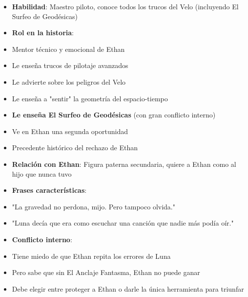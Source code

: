 \documentclass[11pt,a4paper]{report}
\begin{document}
\begin{itemize}
  \item \textbf{Habilidad}: Maestro piloto, conoce todos los trucos del Velo (incluyendo El Surfeo de Geodésicas)
  \item \textbf{Rol en la historia}: 
  \item Mentor técnico y emocional de Ethan
  \item Le enseña trucos de pilotaje avanzados
  \item Le advierte sobre los peligros del Velo
  \item Le enseña a "sentir" la geometría del espacio-tiempo
  \item \textbf{Le enseña El Surfeo de Geodésicas} (con gran conflicto interno)
  \item Ve en Ethan una segunda oportunidad
  \item Precedente histórico del rechazo de Ethan
  \item \textbf{Relación con Ethan}: Figura paterna secundaria, quiere a Ethan como al hijo que nunca tuvo
  \item \textbf{Frases características}: 
  \item "La gravedad no perdona, mijo. Pero tampoco olvida."
  \item "Luna decía que era como escuchar una canción que nadie más podía oír."
  \item \textbf{Conflicto interno}: 
  \item Tiene miedo de que Ethan repita los errores de Luna
  \item Pero sabe que sin El Anclaje Fantasma, Ethan no puede ganar
  \item Debe elegir entre proteger a Ethan o darle la única herramienta para triunfar

\end{itemize}
\end{document}
